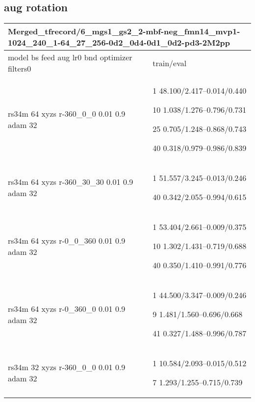 \documentclass[,table,dvipsnames]{article}
\begin{document}
\subsection{aug rotation}
\noindent\begin{tabular}{|p{9cm}|p{6cm}| }	
	\hline
	\multicolumn{2}{|p{15cm}|}{Merged\_tfrecord/6\_mgs1\_gs2\_2-mbf-neg\_fmn14\_mvp1-1024\_240\_1-64\_27\_256-0d2\_0d4-0d1\_0d2-pd3-2M2pp}\\
	\hline
	model bs feed aug lr0 bnd optimizer filters0 & train/eval \\
	
	
	\rowcolor{green!20}
	rs34m 64 xyzs r-360\_0\_0 0.01 0.9 adam 32& 1 48.100/2.417--0.014/0.440\par 10 1.038/1.276--0.796/0.731\par 25 0.705/1.248--0.868/0.743\par 40 0.318/0.979--0.986/0.839\\
	
	\rowcolor{yellow!20}
	rs34m 64 xyzs r-360\_30\_30 0.01 0.9 adam 32& 1 51.557/3.245--0.013/0.246\par 40 0.342/2.055--0.994/0.615\\
	
	\rowcolor{blue!20}
	rs34m 64 xyzs r-0\_0\_360 0.01 0.9 adam 32& 1 53.404/2.661--0.009/0.375\par 10 1.302/1.431--0.719/0.688\par 40 0.350/1.410--0.991/0.776\\ 
	
	\rowcolor{red!20}
	rs34m 64 xyzs r-0\_360\_0 0.01 0.9 adam 32& 1 44.500/3.347--0.009/0.246\par 9 1.481/1.560--0.696/0.668\par 41 0.327/1.488--0.996/0.787\\
	
	\rowcolor{green!20}
	rs34m 32 xyzs r-360\_0\_0 0.01 0.9 adam 32& 1 10.584/2.093--0.015/0.512\par 7 1.293/1.255--0.715/0.739\\
	\hline
	
\end{tabular}
\end{document}
